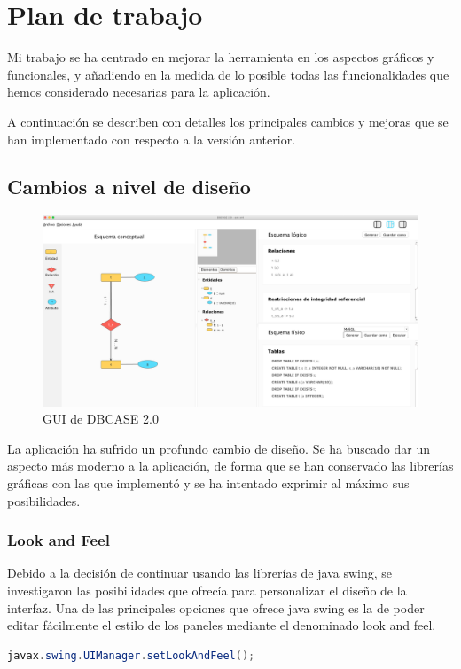 \chapter{Plan de trabajo}
Mi trabajo se ha centrado en mejorar la herramienta en los aspectos gráficos y funcionales, y añadiendo en la medida de lo posible todas las funcionalidades que hemos considerado necesarias para la aplicación.

A continuación se describen con detalles los principales cambios y mejoras que se han implementado con respecto a la versión anterior.
\section{Cambios a nivel de diseño}
\begin{figure}[H]
    \centering
    \includegraphics[width=\textwidth]{img/GUI_DBCASE.png}
    \caption{GUI de DBCASE 2.0}
\end{figure}
La aplicación ha sufrido un profundo cambio de diseño. Se ha buscado dar un aspecto más moderno a la aplicación, de forma que se han conservado las librerías gráficas con las que implementó y se ha intentado exprimir al máximo sus posibilidades.\\

\subsection{Look and Feel}
Debido a la decisión de continuar usando las librerías de java swing, se investigaron las posibilidades que ofrecía para personalizar el diseño de la interfaz. Una de las principales opciones que ofrece java swing es la de poder editar fácilmente el estilo de los paneles mediante el denominado look and feel.

\begin{lstlisting}[backgroundcolor = \color{white},
                   xleftmargin = 2cm,language=java,basicstyle=\medium]
javax.swing.UIManager.setLookAndFeel();
\end{lstlisting}

